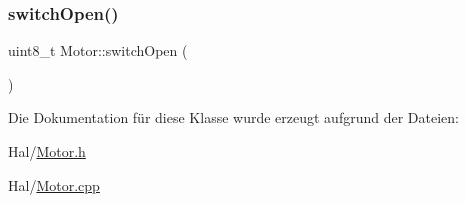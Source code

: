\hypertarget{class_motor_a35c0d7c6350b9f670dc243d31ea40263}{}\label{class_motor_a35c0d7c6350b9f670dc243d31ea40263} 
\subsubsection{\texorpdfstring{switch\+Open()}{switchOpen()}}
{\footnotesize\ttfamily uint8\+\_\+t Motor\+::switch\+Open (\begin{DoxyParamCaption}{ }\end{DoxyParamCaption})}



Die Dokumentation für diese Klasse wurde erzeugt aufgrund der Dateien\+:\begin{DoxyCompactItemize}
\item 
Hal/\hyperlink{_motor_8h}{Motor.\+h}\item 
Hal/\hyperlink{_motor_8cpp}{Motor.\+cpp}\end{DoxyCompactItemize}
